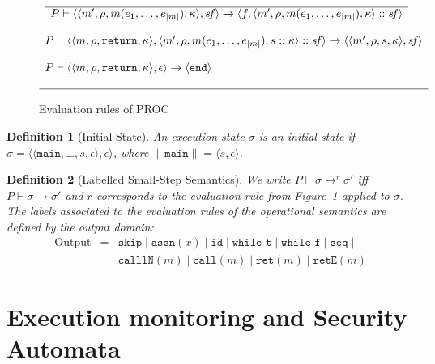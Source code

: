\documentclass[10pt,notitlepage,twoside]{article}
\newcommand{\eframe}[4]{\langle #1, #2, #3, #4 \rangle}
\newcommand{\state}[2]{\langle #1, #2 \rangle}
\newcommand{\stateend}{\langle \texttt{end} \rangle}
\newcommand{\cf}{\mathit{sf}}
\newcommand{\aut}{a}
\newtheorem{definition}{Definition}
\begin{document}
\begin{figure}
\begin{displaymath}
\begin{array}{l}
\begin{array}{c}
\hline
P \vdash \state{\eframe{m'}{\rho}{m(e_1,\ldots,e_{|m|})}{\kappa}}{\cf} \rightarrow \state{f}{\eframe{m'}{\rho}{m(e_1,\ldots,e_{|m|})}{\kappa} ::\cf} 
\end{array} \\
\ \\
P \vdash \state{\eframe{m}{\rho}{\texttt{return}}{\kappa}}{\eframe{m'}{\rho}{m(e_1,\ldots,e_{|m|})}{s::\kappa}   :: \cf}\rightarrow \state{\eframe{m'}{\rho}{s}{\kappa}   }{\cf} \\
\ \\
P \vdash \state{\eframe{m}{\rho}{\texttt{return}}{\kappa}}{\epsilon}\rightarrow \stateend \\
\ \\
\hline
\end{array}
\end{displaymath}
\caption{Evaluation rules of PROC}\label{fig:opsem}
\end{figure}

\begin{definition}[Initial State]
An execution state $\sigma$ is an initial state if $\sigma = \state{\eframe{\texttt{main}}{\bot}{s}{\epsilon}}{\epsilon}$, where $\|\texttt{main}\| = \langle s,\epsilon \rangle$.

\end{definition}

\begin{definition}[Labelled Small-Step Semantics]\label{def:labelled-opsem}
We write $P \vdash \sigma \rightarrow^r \sigma'$ iff $P \vdash \sigma \rightarrow \sigma'$ and $r$ corresponds to the evaluation rule from Figure~\ref{fig:opsem} applied to $\sigma$. The labels associated to the evaluation rules of the operational semantics are defined by the \textrm{output} domain:
\begin{displaymath}
\begin{array}{rcl}
\textrm{Output} & = & \texttt{skip} \mid \texttt{assn}(x) \mid \texttt{id} \mid \texttt{while-t} \mid \texttt{while-f} \mid \texttt{seq} \mid \\
& & \texttt{calllN}(m) \mid \texttt{call}(m) \mid \texttt{ret}(m) \mid \texttt{retE}(m)
\end{array}
\end{displaymath}
\end{definition}


\section{Execution monitoring and Security Automata}
\end{document}

